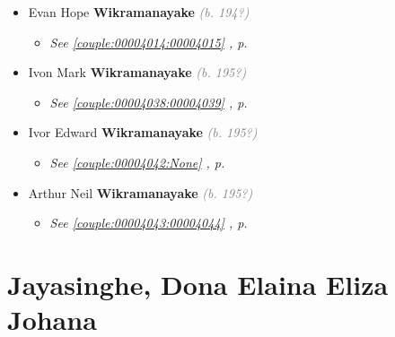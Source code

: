 \documentclass[10pt, openany]{book}
\begin{document}
\begin{itemize}
{\begin{itemize}
{\begin{itemize}
\end{itemize}
 }
\item{Evan Hope \textbf{Wikramanayake} \textcolor{gray}{\textit{(b. 194?)}}
\begin{itemize}
\item{\textcolor{slteal}{\textit{See  \autoref{couple:00004014:00004015} \textit{, p. \pageref{couple:00004014:00004015} }}}}
\end{itemize}
  }
\item{Ivon Mark \textbf{Wikramanayake} \textcolor{gray}{\textit{(b. 195?)}}
\begin{itemize}
\item{\textcolor{slteal}{\textit{See  \autoref{couple:00004038:00004039} \textit{, p. \pageref{couple:00004038:00004039} }}}}
\end{itemize}
  }
\item{Ivor Edward \textbf{Wikramanayake} \textcolor{gray}{\textit{(b. 195?)}}
\begin{itemize}
\item{\textcolor{slteal}{\textit{See  \autoref{couple:00004042:None} \textit{, p. \pageref{couple:00004042:None} }}}}
\end{itemize}
  }
\item{Arthur Neil \textbf{Wikramanayake} \textcolor{gray}{\textit{(b. 195?)}}
\begin{itemize}
\item{\textcolor{slteal}{\textit{See  \autoref{couple:00004043:00004044} \textit{, p. \pageref{couple:00004043:00004044} }}}}
\end{itemize}
  }
\end{itemize}}
\end{itemize}
  
\part{Jayasinghe, Dona Elaina Eliza Johana}
\end{document}

